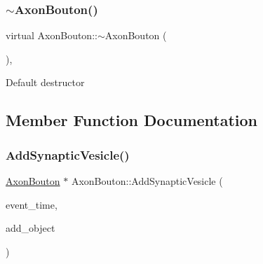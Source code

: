 \mbox{\label{classAxonBouton_ab6f93f680d19d4f07476d1d1b3de776a}} 
\subsubsection{\texorpdfstring{$\sim$\+Axon\+Bouton()}{~AxonBouton()}}
{\footnotesize\ttfamily virtual Axon\+Bouton\+::$\sim$\+Axon\+Bouton (\begin{DoxyParamCaption}{ }\end{DoxyParamCaption})\hspace{0.3cm}{\ttfamily [inline]}, {\ttfamily [virtual]}}

Default destructor 

\subsection{Member Function Documentation}
\mbox{\label{classAxonBouton_a3009e5d49c699afa7f633b026b37ed77}} 
\subsubsection{\texorpdfstring{Add\+Synaptic\+Vesicle()}{AddSynapticVesicle()}}
{\footnotesize\ttfamily \mbox{\hyperlink{classAxonBouton}{Axon\+Bouton}} $\ast$ Axon\+Bouton\+::\+Add\+Synaptic\+Vesicle (\begin{DoxyParamCaption}\item[{std\+::chrono\+::time\+\_\+point$<$ \mbox{\hyperlink{universe_8h_a0ef8d951d1ca5ab3cfaf7ab4c7a6fd80}{Clock}} $>$}]{event\+\_\+time,  }\item[{\mbox{\hyperlink{classAxonBouton}{Axon\+Bouton}} $\ast$}]{add\+\_\+object }\end{DoxyParamCaption})}

\mbox{\label{classAxonBouton_a0e264da88f6ca5d77aa42f415cb4f3aa}} 
